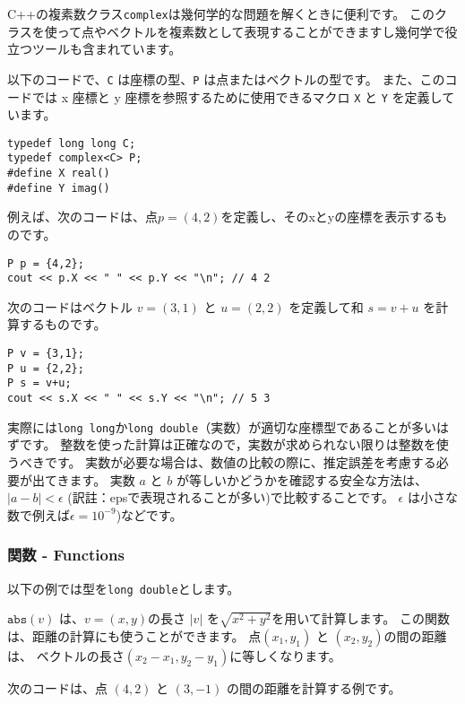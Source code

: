 
C++の複素数クラス\texttt{complex}は幾何学的な問題を解くときに便利です。
このクラスを使って点やベクトルを複素数として表現することができますし幾何学で役立つツールも含まれています。

以下のコードで、\texttt{C} は座標の型、\texttt{P} は点またはベクトルの型です。
また、このコードでは x 座標と y 座標を参照するために使用できるマクロ \texttt{X} と \texttt{Y} を定義しています。

\begin{lstlisting}
typedef long long C;
typedef complex<C> P;
#define X real()
#define Y imag()
\end{lstlisting}

例えば、次のコードは、点$p = (4, 2)$を定義し、そのxとyの座標を表示するものです。

\begin{lstlisting}
P p = {4,2};
cout << p.X << " " << p.Y << "\n"; // 4 2
\end{lstlisting}

次のコードはベクトル $v = (3, 1)$ と $u = (2, 2)$ を定義して和 $s = v + u$ を計算するものです。
\begin{lstlisting}
P v = {3,1};
P u = {2,2};
P s = v+u;
cout << s.X << " " << s.Y << "\n"; // 5 3
\end{lstlisting}

実際には\texttt{long long}か\texttt{long double}（実数）が適切な座標型であることが多いはずです。
整数を使った計算は正確なので，実数が求められない限りは整数を使うべきです。
実数が必要な場合は、数値の比較の際に、推定誤差を考慮する必要が出てきます。
実数 $a$ と $b$ が等しいかどうかを確認する安全な方法は、
$|a-b|<\epsilon$ (訳註：epsで表現されることが多い)で比較することです。
$\epsilon$ は小さな数で例えば$\epsilon=10^{-9}$)などです。

\subsubsection*{関数 - Functions}

以下の例では型を\texttt{long double}とします。

$\texttt{abs}(v)$ は、$v=(x,y)$の長さ $|v|$ を$\sqrt{x^2+y^2}$を用いて計算します。
この関数は、距離の計算にも使うことができます。 点$(x_1,y_1)$ と $(x_2,y_2)$の間の距離は、
ベクトルの長さ$(x_2-x_1,y_2-y_1)$に等しくなります。

次のコードは、点 $(4, 2)$ と $(3, -1)$ の間の距離を計算する例です。

